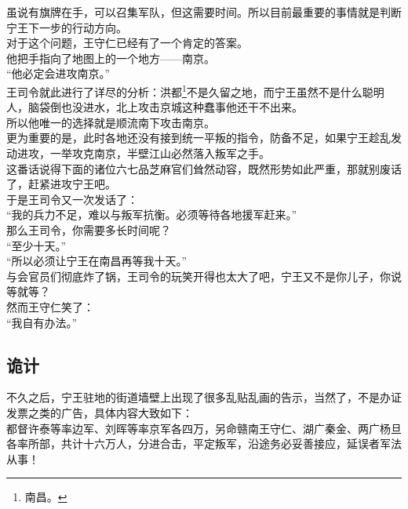 \begin{multicols}{\theparacolNo}
虽说有旗牌在手，可以召集军队，但这需要时间。所以目前最重要的事情就是判断宁王下一步的行动方向。\\

对于这个问题，王守仁已经有了一个肯定的答案。\\

他把手指向了地图上的一个地方——南京。\\

“他必定会进攻南京。”\\

王司令就此进行了详尽的分析：洪都\footnote{南昌。}不是久留之地，而宁王虽然不是什么聪明人，脑袋倒也没进水，北上攻击京城这种蠢事他还干不出来。\\

所以他唯一的选择就是顺流南下攻击南京。\\

更为重要的是，此时各地还没有接到统一平叛的指令，防备不足，如果宁王趁乱发动进攻，一举攻克南京，半壁江山必然落入叛军之手。\\

这番话说得下面的诸位六七品芝麻官们耸然动容，既然形势如此严重，那就别废话了，赶紧进攻宁王吧。\\

于是王司令又一次发话了：\\

“我的兵力不足，难以与叛军抗衡。必须等待各地援军赶来。”\\

那么王司令，你需要多长时间呢？\\

“至少十天。”\\

“所以必须让宁王在南昌再等我十天。”\\

与会官员们彻底炸了锅，王司令的玩笑开得也太大了吧，宁王又不是你儿子，你说等就等？\\

然而王守仁笑了：\\

“我自有办法。”\\

\subsection{诡计}
不久之后，宁王驻地的街道墙壁上出现了很多乱贴乱画的告示，当然了，不是办证发票之类的广告，具体内容大致如下：\\

都督许泰等率边军、刘晖等率京军各四万，另命赣南王守仁、湖广秦金、两广杨旦各率所部，共计十六万人，分进合击，平定叛军，沿途务必妥善接应，延误者军法从事！\\


\end{multicols}
